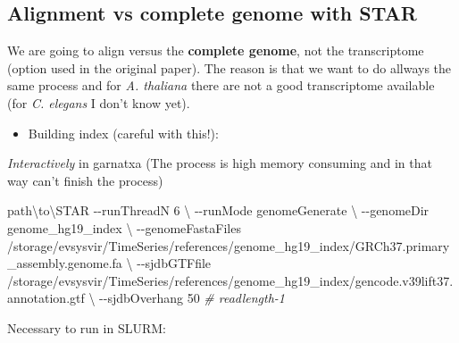 \documentclass[
]{book}
\newenvironment{Shaded}{\begin{snugshade}}{\end{snugshade}}
\newcommand{\AttributeTok}[1]{\textcolor[rgb]{0.77,0.63,0.00}{#1}}
\newcommand{\CommentTok}[1]{\textcolor[rgb]{0.56,0.35,0.01}{\textit{#1}}}
\newcommand{\ControlFlowTok}[1]{\textcolor[rgb]{0.13,0.29,0.53}{\textbf{#1}}}
\newcommand{\DataTypeTok}[1]{\textcolor[rgb]{0.13,0.29,0.53}{#1}}
\newcommand{\ExtensionTok}[1]{#1}
\newcommand{\NormalTok}[1]{#1}
\newcommand{\OperatorTok}[1]{\textcolor[rgb]{0.81,0.36,0.00}{\textbf{#1}}}
\newcommand{\VariableTok}[1]{\textcolor[rgb]{0.00,0.00,0.00}{#1}}
\providecommand{\tightlist}{%
  \setlength{\itemsep}{0pt}\setlength{\parskip}{0pt}}
\begin{document}
\begin{Shaded}
\end{Shaded}

\hypertarget{alignment-vs-complete-genome-with-star}{%
\subsection{Alignment vs complete genome with STAR}\label{alignment-vs-complete-genome-with-star}}

We are going to align versus the \textbf{complete genome}, not the transcriptome (option used in the original paper). The reason is that we want to do allways the same process and for \emph{A. thaliana} there are not a good transcriptome available (for \emph{C. elegans} I don't know yet).

\begin{itemize}
\tightlist
\item
  Building index (careful with this!):
\end{itemize}

\emph{Interactively} in garnatxa (The process is high memory consuming and in that way can't finish the process)

\begin{Shaded}
\begin{Highlighting}[]
\ExtensionTok{path\textbackslash{}to\textbackslash{}STAR} \AttributeTok{{-}{-}runThreadN}\NormalTok{ 6 }\DataTypeTok{\textbackslash{}}
\NormalTok{{-}{-}runMode genomeGenerate }\DataTypeTok{\textbackslash{}}
\NormalTok{{-}{-}genomeDir genome\_hg19\_index }\DataTypeTok{\textbackslash{}}
\NormalTok{{-}{-}genomeFastaFiles /storage/evsysvir/TimeSeries/references/genome\_hg19\_index/GRCh37.primary\_assembly.genome.fa }\DataTypeTok{\textbackslash{}}
\NormalTok{{-}{-}sjdbGTFfile /storage/evsysvir/TimeSeries/references/genome\_hg19\_index/gencode.v39lift37.annotation.gtf }\DataTypeTok{\textbackslash{}}
\NormalTok{{-}{-}sjdbOverhang 50 }\CommentTok{\# readlength{-}1}
\end{Highlighting}
\end{Shaded}

Necessary to run in SLURM:
\end{document}
